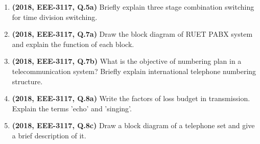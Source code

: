 \documentclass[12pt, a4paper]{article}
\begin{document}
\begin{enumerate}
		\item \textbf{(2018, EEE-3117, Q.5a)} Briefly explain three stage combination switching for time division switching.
		\item \textbf{(2018, EEE-3117, Q.7a)} Draw the block diagram of RUET PABX system and explain the function of each block.
		\item \textbf{(2018, EEE-3117, Q.7b)} What is the objective of numbering plan in a telecommunication system? Briefly explain international telephone numbering structure.
		\item \textbf{(2018, EEE-3117, Q.8a)} Write the factors of loss budget in transmission. Explain the terms 'echo' and 'singing'.
		\item \textbf{(2018, EEE-3117, Q.8c)} Draw a block diagram of a telephone set and give a brief description of it.
		

\end{enumerate}
\end{document}
